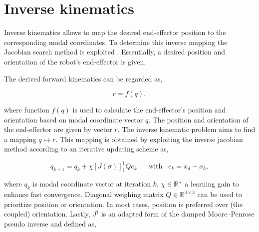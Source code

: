 \section{Inverse kinematics}
\label{app:chap2}



Inverse kinematics allows to map the desired end-effector position to the corresponding modal coordinates. To determine this inverse mapping the Jacobian search method is exploited \cite{JacobianInverse}. Essentially, a desired position and orientation of the robot's end-effector is given. 


The derived forward kinematics can be regarded as,

\begin{equation}
    r = f(q),
\end{equation}

where function $f(q)$ is used to calculate the end-effector's position and orientation based on modal coordinate vector $q$. The position and orientation of the end-effector are given by vector $r$. The inverse kinematic problem aims to find a mapping $q\mapsto r$. This mapping is obtained by exploiting the inverse jacobian method according to an iterative updating scheme as,

\begin{equation}
    q_{k+1} = q_k + \chi [J(\sigma)]_1^\dagger Q e_k \hspace{20pt} \text{with} \hspace{10pt}  e_k = x_d - x_k,
    \label{eq2:qupdate}
\end{equation}

where $q_k$ is modal coordinate vector at iteration $k$, $\chi \in \mathbb{R}^+$ a learning gain to enhance fast convergence. Diagonal weighing matrix $Q \in \mathbb{R}^{3\times 3}$ can be used to prioritize position or orientation. In most cases, position is preferred over (the coupled) orientation. Lastly, $J^\dagger$ is an adapted form of the damped Moore–Penrose pseudo inverse and defined as,

